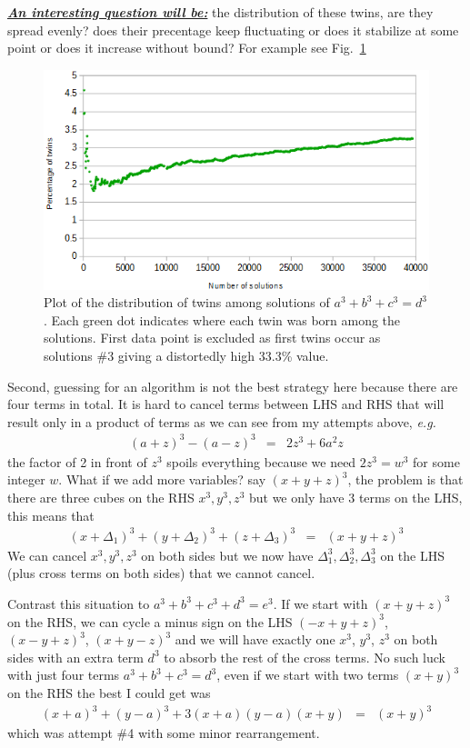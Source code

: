 \documentclass[aps,preprint,preprintnumbers,nofootinbib,showpacs,prd]{revtex4-1}
\newcommand{\eg}{{\it e.g.} }
\newcommand{\nbea}{\begin{eqnarray*}}
\newcommand{\neea}{\end{eqnarray*}}
\begin{document}
\underline{\textit{\textbf{An interesting question will be:}}} the distribution of these twins, are they spread evenly? does their precentage keep fluctuating or does it stabilize at some point or does it increase without bound? For example see Fig.~\ref{fig:twins-dist}
%
\begin{figure}
\centering
  \includegraphics[width=.7\linewidth]{FLT_twins_dist.png}
  \caption{Plot of the distribution of twins among solutions of $a^3 + b^3 + c^3 = d^3$. Each green dot indicates where each twin was born among the solutions. First data point is excluded as first twins occur as solutions \#3 giving a distortedly high 33.3\% value.}
\label{fig:twins-dist}
\end{figure}
%

Second, guessing for an algorithm is not the best strategy here because there are four terms in total. It is hard to cancel terms between LHS and RHS that will result only in a product of terms as we can see from my attempts above, \eg
%
\nbea
(a+z)^3 - (a-z)^3 & = & 2 z^3 + 6 a^2 z
\neea
%
the factor of 2 in front of $z^3$ spoils everything because we need $2 z^3 = w^3$ for some integer $w$. What if we add more variables? say $(x + y +z)^3$, the problem is that there are three cubes on the RHS $x^3, y^3, z^3$ but we only have 3 terms on the LHS, this means that
%
\nbea
(x+\Delta_1)^3 + (y+\Delta_2)^3 + (z+\Delta_3)^3 & = & (x + y +z)^3
\neea
%
We can cancel $x^3, y^3,z^3$ on both sides but we now have $\Delta_1^3, \Delta_2^3, \Delta_3^3$ on the LHS (plus cross terms on both sides) that we cannot cancel.

Contrast this situation to $a^3 + b^3 + c^3 + d^3 = e^3$. If we start with $(x+y+z)^3$ on the RHS, we can cycle a minus sign on the LHS $(-x+y+z)^3$, $(x-y+z)^3$, $(x+y-z)^3$ and we will have exactly one $x^3$, $y^3$, $z^3$ on both sides with an extra term $d^3$ to absorb the rest of the cross terms. No such luck with just four terms $a^3 + b^3 + c^3 = d^3$, even if we start with two terms $(x+y)^3$ on the RHS the best I could get was
%
\nbea
(x+a)^3 + (y-a)^3 + 3 (x+a)(y-a)(x+y) & = & (x+y)^3
\neea
%
which was attempt \#4 with some minor rearrangement.
\end{document}
